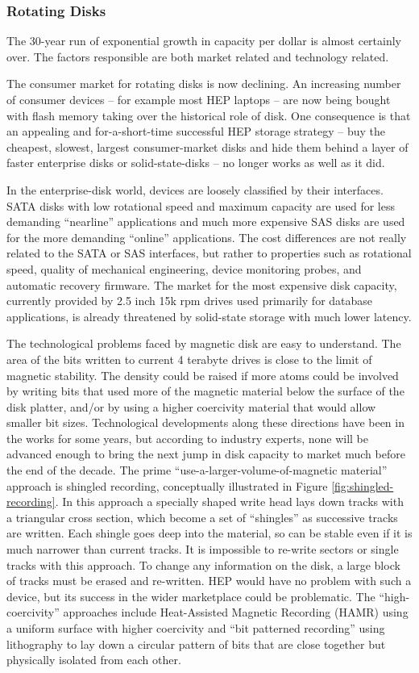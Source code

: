 \subsubsection{Rotating Disks}
The 30-year run of exponential growth in capacity per dollar is almost certainly over.  
The factors responsible are both market related and technology related.

The consumer market for rotating disks is now declining.  An increasing number of 
consumer devices -- for example most HEP laptops -- are now being bought with flash 
memory taking over the historical role of disk.  One consequence is that an appealing 
and for-a-short-time successful HEP storage strategy -- buy the cheapest, slowest, 
largest consumer-market disks and hide them behind a layer of faster enterprise disks 
or solid-state-disks -- no longer works as well as it did.

In the enterprise-disk world, devices are loosely classified by their interfaces. 
SATA disks with low rotational speed and maximum capacity are used for less demanding 
“nearline” applications and much more expensive SAS disks are used for the more 
demanding “online” applications.  The cost differences are not really related to the 
SATA or SAS interfaces, but rather to properties such as rotational speed, quality of 
mechanical engineering, device monitoring probes,  and automatic recovery 
firmware.   The market for the most 
expensive disk capacity, currently provided by 2.5 inch 15k rpm drives used 
primarily for database applications, is already threatened by solid-state 
storage with much lower latency. 

The technological problems faced by magnetic disk are easy to understand. The area 
of the bits written to current 4 terabyte drives is close to the limit of magnetic 
stability.  The density could be raised if more atoms could be involved by writing 
bits that used more of the magnetic material below the surface of the disk platter, 
and/or by using a higher coercivity material that would allow smaller bit sizes.  
Technological developments along these directions have been in the works for some 
years, but according to industry experts, none will be advanced enough to bring the 
next jump in disk capacity to market much before the end of the decade.  The prime 
``use-a-larger-volume-of-magnetic material'' approach is shingled recording, 
conceptually illustrated in Figure \ref{fig:shingled-recording}. In this approach a specially shaped write 
head lays down tracks with a triangular cross section, which become a set of 
``shingles'' as successive tracks are written.  Each shingle goes deep into the 
material, so can be stable even if it is much narrower than current tracks.  
It is impossible to re-write sectors or single tracks with this approach.  
To change any information on the disk, a large block of tracks must be erased 
and re-written.  HEP would have no problem with such a device, but its success 
in the wider marketplace could be problematic.  The ``high-coercivity'' approaches 
include Heat-Assisted Magnetic Recording (HAMR) using a uniform surface with higher 
coercivity and ``bit patterned recording'' using lithography to lay down a circular 
pattern of bits that are close together but physically isolated from each other.

